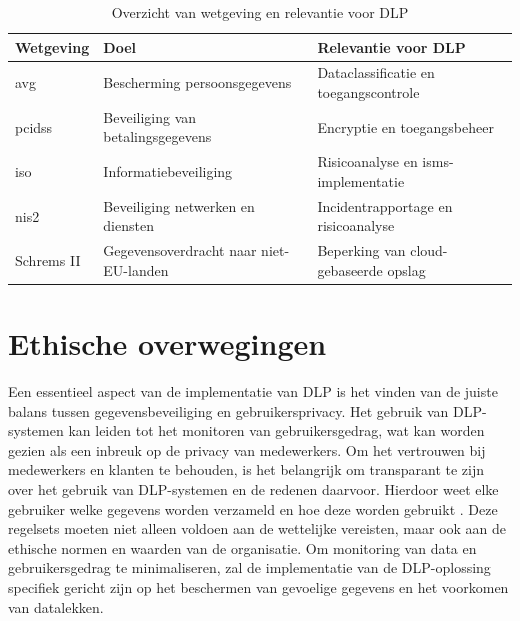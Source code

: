 
  
  \begin{table}[h]
    \centering
    \small
    \scriptsize
    \begin{tabular}{p{4cm} p{5cm} p{6cm}}
        \toprule
        \textbf{Wetgeving} & \textbf{Doel} & \textbf{Relevantie voor DLP} \\
        \midrule
        \gls{avg} & Bescherming persoonsgegevens & Dataclassificatie en toegangscontrole \\
        \gls{pcidss} & Beveiliging van betalingsgegevens & Encryptie en toegangsbeheer \\
        \gls{iso} & Informatiebeveiliging & Risicoanalyse en \gls{isms}-implementatie \\
        \gls{nis2} & Beveiliging netwerken en diensten & Incidentrapportage en risicoanalyse \\
        Schrems II & Gegevensoverdracht naar niet-EU-landen & Beperking van cloud-gebaseerde opslag \\
        \bottomrule
    \end{tabular}
    \caption{Overzicht van wetgeving en relevantie voor DLP}
    \label{tab:wetgeving_dlp}
\end{table}


  

\section{Ethische overwegingen}%

Een essentieel aspect van de implementatie van DLP is het vinden van de juiste balans tussen gegevensbeveiliging en gebruikersprivacy. 
Het gebruik van DLP-systemen kan leiden tot het monitoren van gebruikersgedrag, wat kan worden gezien als een inbreuk op de privacy van medewerkers. 
Om het vertrouwen bij medewerkers en klanten te behouden, is het belangrijk om transparant te zijn over het gebruik van DLP-systemen en de redenen daarvoor. 
Hierdoor weet elke gebruiker welke gegevens worden verzameld en hoe deze worden gebruikt \autocite{Zaini2024}. 
Deze regelsets moeten niet alleen voldoen aan de wettelijke vereisten, maar ook aan de ethische normen en waarden van de organisatie. 
Om monitoring van data en gebruikersgedrag te minimaliseren, 
zal de implementatie van de DLP-oplossing specifiek gericht zijn op het beschermen van gevoelige gegevens en het voorkomen van datalekken. 

